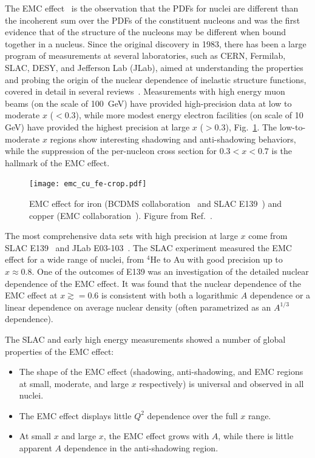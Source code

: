 The EMC effect~\cite{Aubert:1983xm} is the observation that the PDFs for nuclei are different than
the incoherent sum over the PDFs of the constituent nucleons and was the first evidence that 
of the structure of the nucleons may be different when bound together in a nucleus.
Since the original discovery in 1983, there has been a large
program of measurements at several laboratories, such as CERN, Fermilab, SLAC, DESY, and Jefferson Lab (JLab),
aimed at understanding the properties and probing the origin of the nuclear dependence of inelastic
structure functions, covered in detail in several reviews~\cite{Geesaman:1995yd, Malace:2014uea, Hen:2016kwk}.
Measurements with high energy muon beams (on the scale of 100~GeV) have provided high-precision data at low to
moderate $x$ ($<0.3$), while more modest energy electron facilities (on scale of 10 GeV) have provided
the highest precision at large $x$ ($>0.3$), Fig.~\ref{fig:emc_iron}.  The low-to-moderate $x$
regions show interesting shadowing and anti-shadowing behaviors, while the suppression of the
per-nucleon cross section for $0.3<x<0.7$ is the hallmark of the EMC effect.

\begin{figure}[tbp]
  \centering\texttt{[image: emc\_cu\_fe-crop.pdf]}
  \caption{EMC effect for iron (BCDMS collaboration~\cite{Benvenuti:1987az} and SLAC E139~\cite{Gomez:1993ri})
    and copper (EMC collaboration~\cite{Ashman:1992kv}).
    Figure from Ref.~\cite{Guzey:2012yk}.}
  \label{fig:emc_iron}
\end{figure}

The most comprehensive data sets with high precision at large $x$ come from SLAC E139~\cite{Gomez:1993ri} and JLab E03-103~\cite{Seely:2009gt}. The SLAC experiment
measured the EMC effect for a wide range of nuclei, from $^4$He to Au with good precision up to
$x\approx0.8$.  One of the outcomes of E139 was an investigation of the detailed nuclear dependence of the EMC
effect. It was found that the nuclear dependence of the EMC effect at $x \gtrsim =0.6$ is consistent
with both a logarithmic $A$ dependence or a linear dependence on average nuclear density (often parametrized as an $A^{1/3}$ dependence).

The SLAC and early high energy measurements showed a number of global properties of the EMC effect:
\begin{itemize}
 \item{The shape of the EMC effect (shadowing, anti-shadowing, and EMC regions at small, moderate, and
  large $x$ respectively) is universal and observed in all nuclei.}
 \item{The EMC effect displays little $Q^2$ dependence over the full $x$ range.}
 \item{At small $x$ and large $x$, the EMC effect grows with $A$, while there is little apparent $A$ dependence in the
   anti-shadowing region.}
\end{itemize}

